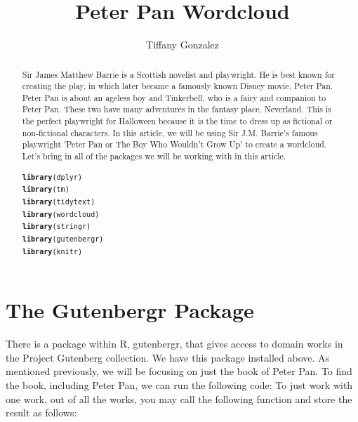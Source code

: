 \documentclass{article}\usepackage[]{graphicx}\usepackage[]{color}
\makeatletter
\newcommand{\hlstd}[1]{\textcolor[rgb]{0.345,0.345,0.345}{#1}}%
\newcommand{\hlkwd}[1]{\textcolor[rgb]{0.737,0.353,0.396}{\textbf{#1}}}%
\newenvironment{kframe}{%
 \def\at@end@of@kframe{}%
 \ifinner\ifhmode%
  \def\at@end@of@kframe{\end{minipage}}%
  \begin{minipage}{\columnwidth}%
 \fi\fi%
 \def\FrameCommand##1{\hskip\@totalleftmargin \hskip-\fboxsep
 \colorbox{shadecolor}{##1}\hskip-\fboxsep
     \hskip-\linewidth \hskip-\@totalleftmargin \hskip\columnwidth}%
 \MakeFramed {\advance\hsize-\width
   \@totalleftmargin\z@ \linewidth\hsize
   \@setminipage}}%
 {\par\unskip\endMakeFramed%
 \at@end@of@kframe}
\newenvironment{knitrout}{}{} %
\makeatother
\begin{document}
\title{Peter Pan Wordcloud}
\author{Tiffany Gonzalez}
\maketitle

\begin{abstract}
Sir James Matthew Barrie is a Scottish novelist and playwright. He is best known for creating the play, in which later became a famously known Disney movie, Peter Pan. Peter Pan is about an ageless boy and Tinkerbell, who is a fairy and companion to Peter Pan. These two have many adventures in the fantasy place, Neverland. This is the perfect playwright for Halloween because it is the time to dress up as fictional or non-fictional characters. In this article, we will be using Sir J.M. Barrie's famous playwright 'Peter Pan or The Boy Who Wouldn't Grow Up' to create a wordcloud. Let's bring in all of the packages we will be working with in this article.

\begin{knitrout}
\color{fgcolor}\begin{kframe}
\begin{alltt}
\hlkwd{library}\hlstd{(dplyr)}
\hlkwd{library}\hlstd{(tm)}
\hlkwd{library}\hlstd{(tidytext)}
\hlkwd{library}\hlstd{(wordcloud)}
\hlkwd{library}\hlstd{(stringr)}
\hlkwd{library}\hlstd{(gutenbergr)}
\hlkwd{library}\hlstd{(knitr)}
\end{alltt}
\end{kframe}
\end{knitrout}


\end{abstract}

\section{The Gutenbergr Package}
There is a package within R, gutenbergr, that gives access to domain works in the Project Gutenberg collection. We have this package installed above. As mentioned previously, we will be focusing on just the book of Peter Pan. To find the book, including Peter Pan, we can run the following code:  To just work with one work, out of all the works, you may call the following function and store the result as follows:
\end{document}
